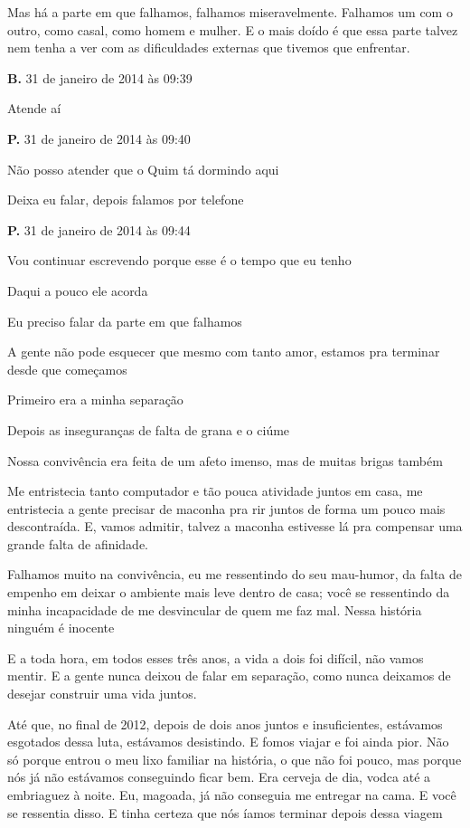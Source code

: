 {Mas há a parte em que falhamos, falhamos miseravelmente. Falhamos um com
o outro, como casal, como homem e mulher. E o mais doído é que essa
parte talvez nem tenha a ver com as dificuldades externas que tivemos
que enfrentar.

\textbf{B.} 31 de janeiro de 2014 às 09:39

Atende aí

\textbf{P.} 31 de janeiro de 2014 às 09:40

Não posso atender que o Quim tá dormindo aqui

Deixa eu falar, depois falamos por telefone

\textbf{P.} 31 de janeiro de 2014 às 09:44

Vou continuar escrevendo porque esse é o tempo que eu tenho

Daqui a pouco ele acorda

Eu preciso falar da parte em que falhamos

A gente não pode esquecer que mesmo com tanto amor, estamos pra terminar
desde que começamos

Primeiro era a minha separação

Depois as inseguranças de falta de grana e o ciúme

Nossa convivência era feita de um afeto imenso, mas de muitas brigas
também

Me entristecia tanto computador e tão pouca atividade juntos em casa, me
entristecia a gente precisar de maconha pra rir juntos de forma um pouco
mais descontraída. E, vamos admitir, talvez a maconha estivesse lá pra
compensar uma grande falta de afinidade.

Falhamos muito na convivência, eu me ressentindo do seu mau-humor, da
falta de empenho em deixar o ambiente mais leve dentro de casa; você se
ressentindo da minha incapacidade de me desvincular de quem me faz mal.
Nessa história ninguém é inocente

E a toda hora, em todos esses três anos, a vida a dois foi difícil, não
vamos mentir. E a gente nunca deixou de falar em separação, como nunca
deixamos de desejar construir uma vida juntos.

Até que, no final de 2012, depois de dois anos juntos e insuficientes,
estávamos esgotados dessa luta, estávamos desistindo. E fomos viajar e
foi ainda pior. Não só porque entrou o meu lixo familiar na história, o
que não foi pouco, mas porque nós já não estávamos conseguindo ficar
bem. Era cerveja de dia, vodca até a embriaguez à noite. Eu, magoada, já
não conseguia me entregar na cama. E você se ressentia disso. E tinha
certeza que nós íamos terminar depois dessa viagem

}
